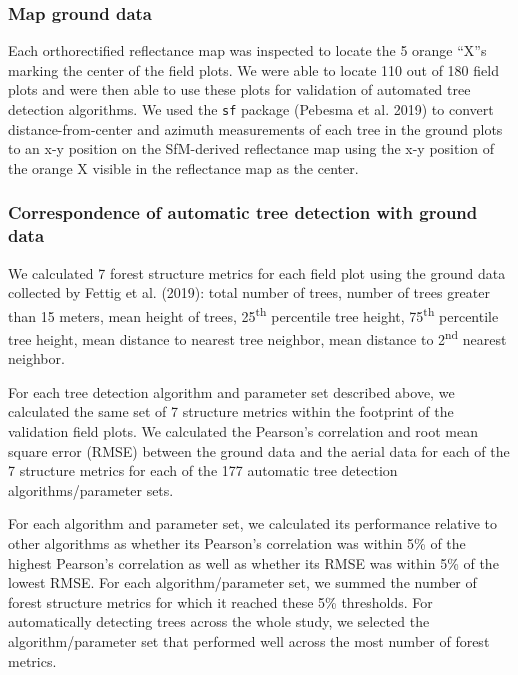 \documentclass[]{article}
\begin{document}
\subsubsection{Map ground data}\label{map-ground-data}

Each orthorectified reflectance map was inspected to locate the 5 orange
``X''s marking the center of the field plots. We were able to locate 110
out of 180 field plots and were then able to use these plots for
validation of automated tree detection algorithms. We used the
\texttt{sf} package (Pebesma et al. 2019) to convert
distance-from-center and azimuth measurements of each tree in the ground
plots to an x-y position on the SfM-derived reflectance map using the
x-y position of the orange X visible in the reflectance map as the
center.

\subsubsection{Correspondence of automatic tree detection with ground
data}\label{correspondence-of-automatic-tree-detection-with-ground-data}

We calculated 7 forest structure metrics for each field plot using the
ground data collected by Fettig et al. (2019): total number of trees,
number of trees greater than 15 meters, mean height of trees,
25\textsuperscript{th} percentile tree height, 75\textsuperscript{th}
percentile tree height, mean distance to nearest tree neighbor, mean
distance to 2\textsuperscript{nd} nearest neighbor.

For each tree detection algorithm and parameter set described above, we
calculated the same set of 7 structure metrics within the footprint of
the validation field plots. We calculated the Pearson's correlation and
root mean square error (RMSE) between the ground data and the aerial
data for each of the 7 structure metrics for each of the 177 automatic
tree detection algorithms/parameter sets.

For each algorithm and parameter set, we calculated its performance
relative to other algorithms as whether its Pearson's correlation was
within 5\% of the highest Pearson's correlation as well as whether its
RMSE was within 5\% of the lowest RMSE. For each algorithm/parameter
set, we summed the number of forest structure metrics for which it
reached these 5\% thresholds. For automatically detecting trees across
the whole study, we selected the algorithm/parameter set that performed
well across the most number of forest metrics.
\end{document}
